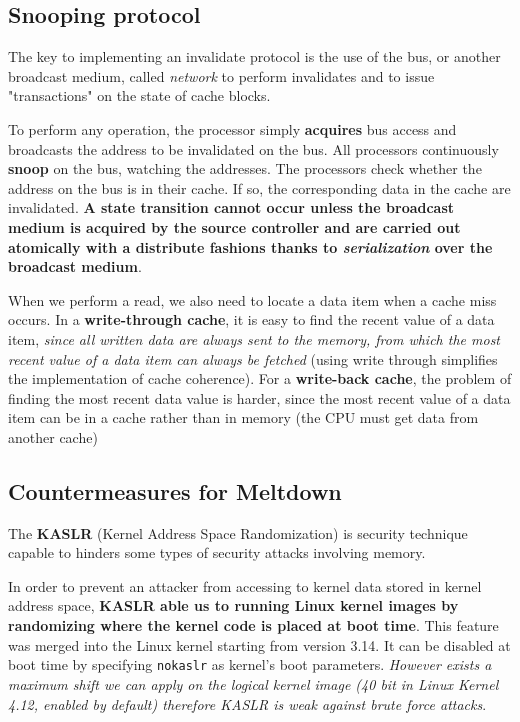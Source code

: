\documentclass[10pt,a4paper]{article}
\begin{document}
\subsection{Snooping protocol}

The key to implementing an invalidate protocol is the use of the bus, or another broadcast medium, called \textit{network} to perform invalidates and to issue "transactions" on the state of cache blocks.

To perform any operation, the processor simply \textbf{acquires} bus access and broadcasts the address to be invalidated on the bus. All processors continuously \textbf{snoop} on the bus, watching the addresses. The processors check whether the address on the bus is in their cache. If so, the corresponding data in the cache are invalidated. \textbf{A state transition cannot occur unless the broadcast medium is acquired by the source controller and are carried out atomically with a distribute fashions thanks to \textit{serialization} over the broadcast medium}.

When we perform a read, we also need to locate a data item when a cache miss occurs. In a \textbf{write-through cache}, it is easy to find the recent value of a data item, \textit{since all written data are always sent to the memory, from which the most recent value of a data item can always be fetched} (using write through simplifies the implementation of cache coherence). For a \textbf{write-back cache}, the problem of finding the most recent data value is
harder, since the most recent value of a data item can be in a cache rather than in memory (the CPU must get data from another cache)



\subsection{Countermeasures for Meltdown}

The \textbf{KASLR} (Kernel Address Space Randomization) is security technique capable to hinders some types of security attacks involving memory. 

In order to prevent an attacker from accessing to kernel data stored in kernel address space, \textbf{KASLR able us to running Linux kernel images by randomizing where the kernel code is placed at boot time}. This feature was merged into the Linux kernel starting from version 3.14. It can be disabled at boot time by specifying \texttt{nokaslr} as kernel's boot parameters. \textit{However exists a maximum shift we can apply on the logical kernel image (40 bit in Linux Kernel 4.12, enabled by default) therefore KASLR is weak against brute force attacks}.
\end{document}
